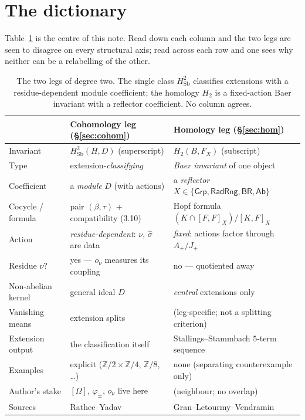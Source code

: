 \documentclass[11pt]{article}
\theoremstyle{definition}
\newcommand{\Sb}{\mathrm{Sb}}
\newcommand{\Grp}{\mathsf{Grp}}
\newcommand{\Ab}{\mathsf{Ab}}
\newcommand{\RadRng}{\mathsf{RadRng}}
\newcommand{\BR}{\mathsf{BR}}
\newcommand{\Z}{\mathbb{Z}}
\newcommand{\shat}{\widehat{\sigma}}
\begin{document}
\section{The dictionary}\label{sec:dictionary}

Table~\ref{tab:legs} is the centre of this note. Read down each column and the two legs are
seen to disagree on every structural axis; read across each row and one sees why neither can
be a relabelling of the other.

\begin{table}[h]
\centering
\renewcommand{\arraystretch}{1.35}
\begin{tabular}{@{}p{} p{} p{}@{}}
\toprule
& \textbf{Cohomology leg} (\S\ref{sec:cohom}) & \textbf{Homology leg} (\S\ref{sec:hom})\\
\midrule
Invariant & $H^2_{\Sb}(H,D)$ (superscript) & $H_2(B,F_X)$ (subscript)\\
Type & extension-\emph{classifying} & \emph{Baer invariant} of one object\\
Coefficient & a \emph{module} $D$ (with actions) & a \emph{reflector} $X\in\{\Grp,\RadRng,\BR,\Ab\}$\\
Cocycle / formula & pair $(\beta,\tau)$ + compatibility (3.10) & Hopf formula $(K\cap[F,F]_X)/[K,F]_X$\\
Action & \emph{residue-dependent}: $\nu$, $\shat$ are data & \emph{fixed}: actions factor through $A_+/J_+$\\
Residue $\nu$? & yes --- $o_\nu$ measures its coupling & no --- quotiented away\\
Non-abelian kernel & general ideal $D$ & \emph{central} extensions only\\
Vanishing means & extension splits & (leg-specific; not a splitting criterion)\\
Extension output & the classification itself & Stallings--Stammbach $5$-term sequence\\
Examples & explicit ($\Z/2\times\Z/4$, $\Z/8$, \dots) & none (separating counterexample only)\\
Author's stake & $[\Omega]$, $\varphi_\pm$, $o_\nu$ live here & (neighbour; no overlap)\\
Sources & Rathee--Yadav~\cite{RY} & Gran--Letourmy--Vendramin~\cite{GLV}\\
\bottomrule
\end{tabular}
\caption{The two legs of degree two. The single class $H^2_{\Sb}$ classifies extensions with
a residue-dependent module coefficient; the homology $H_2$ is a fixed-action Baer invariant
with a reflector coefficient. No column agrees.}
\label{tab:legs}
\end{table}
\end{document}
